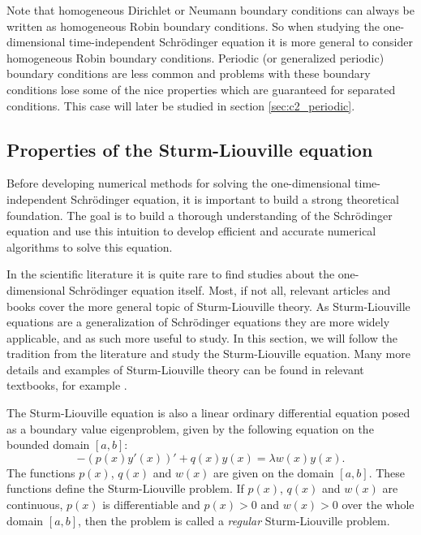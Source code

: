 Note that homogeneous Dirichlet or Neumann boundary conditions can always be written as homogeneous Robin boundary conditions. So when studying the one-dimensional time-independent Schrödinger equation it is more general to consider homogeneous Robin boundary conditions. Periodic (or generalized periodic) boundary conditions are less common and problems with these boundary conditions lose some of the nice properties which are guaranteed for separated conditions. This case will later be studied in section \ref{sec:c2_periodic}.

\subsection{Properties of the Sturm-Liouville equation}\label{sec:c2_slp_properties}

Before developing numerical methods for solving the one-dimensional time-independent Schrödinger equation, it is important to build a strong theoretical foundation. The goal is to build a thorough understanding of the Schrödinger equation and use this intuition to develop efficient and accurate numerical algorithms to solve this equation.

In the scientific literature it is quite rare to find studies about the one-dimensional Schrödinger equation itself. Most, if not all, relevant articles and books cover the more general topic of Sturm-Liouville theory. As Sturm-Liouville equations are a generalization of Schrödinger equations they are more widely applicable, and as such more useful to study. In this section, we will follow the tradition from the literature and study the Sturm-Liouville equation. Many more details and examples of Sturm-Liouville theory can be found in relevant textbooks, for example \cite[Chapter~5]{sagan_boundary_1961}.

The Sturm-Liouville equation is also a linear ordinary differential equation posed as a boundary value eigenproblem, given by the following equation on the bounded domain $[a, b]$:
\begin{equation}\label{equ:c2_sturm_liovuille_equation}
    -(p(x) y'(x))' + q(x) y(x) = \lambda w(x) y(x)\text{.}
\end{equation}
The functions $p(x)$, $q(x)$ and $w(x)$ are given on the domain $[a, b]$. These functions define the Sturm-Liouville problem. If $p(x)$, $q(x)$ and $w(x)$ are continuous, $p(x)$ is differentiable and $p(x) > 0$ and $w(x) > 0$ over the whole domain $[a, b]$, then the problem is called a \emph{regular} Sturm-Liouville problem.

